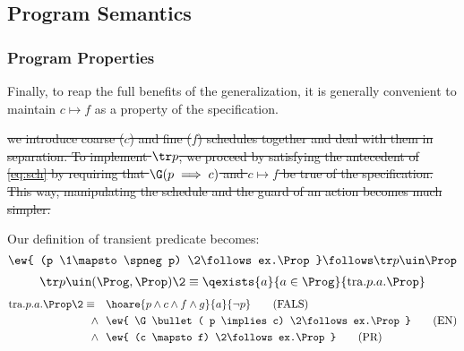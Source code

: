 
\subsection{Program Semantics}
\label{sec:semantics}



%

\subsubsection{Program Properties}
Finally, to reap the full benefits of the generalization, it is generally convenient to maintain $c \mapsto f$ as a property of the specification.

\sout{we introduce coarse ($c$) and fine ($f$) schedules together and deal with them in separation. To implement $\tr p$, we proceed by satisfying the antecedent of \eqref{eq:sch} by requiring that $\G (p \implies c)$ and $c \mapsto f$ be true of the specification. This way, manipulating the schedule and the guard of an action becomes much simpler.}


Our definition of transient predicate becomes:
\[ \ew{ (p \1\mapsto \spneg p) \2\follows ex.\Prop} \follows \tr p \uin \Prop \]
\begin{align*}
 \tr p \uin (\Prog, \Prop)  \2\equiv \qexists{a}{ a \in \Prog }{ \text{tra}.p.a.\Prop }
\end{align*}
\begin{align*}
	\text{tra}.p.a.\Prop \2\equiv 
	\quad	& \hoare{ p \land c \land f \land g }{ a }{ \neg p } \tag{FALS} \\
	\land ~~	& \ew{ \G \bullet( p \implies c) \2\follows ex.\Prop} \tag{EN} \\
	\land ~~ 	& \ew{ (c \mapsto f) \2\follows ex.\Prop } \tag{PR}
\end{align*}

